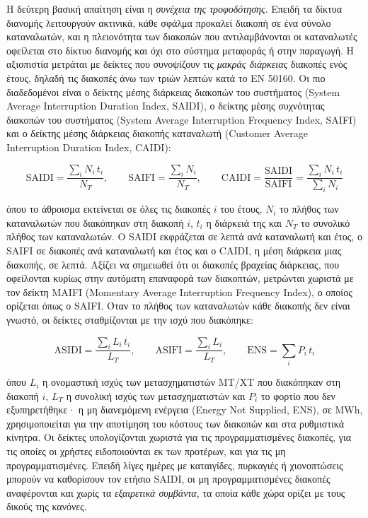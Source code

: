 Η δεύτερη βασική απαίτηση είναι η \emph{συνέχεια της τροφοδότησης}. Επειδή τα δίκτυα
διανομής λειτουργούν ακτινικά, κάθε σφάλμα προκαλεί διακοπή σε ένα σύνολο καταναλωτών, και
η πλειονότητα των διακοπών που αντιλαμβάνονται οι καταναλωτές οφείλεται στο δίκτυο διανομής
και όχι στο σύστημα μεταφοράς ή στην παραγωγή. Η αξιοπιστία μετράται με δείκτες που
συνοψίζουν τις \emph{μακράς διάρκειας} διακοπές ενός έτους, δηλαδή τις διακοπές άνω των
τριών λεπτών κατά το EN 50160. Οι πιο διαδεδομένοι είναι ο δείκτης μέσης διάρκειας διακοπών
του συστήματος (System Average Interruption Duration Index, SAIDI), ο δείκτης μέσης συχνότητας
διακοπών του συστήματος (System Average Interruption Frequency Index, SAIFI) και ο δείκτης
μέσης διάρκειας διακοπής καταναλωτή (Customer Average Interruption Duration Index, CAIDI):

\begin{equation}
\mathrm{SAIDI} = \frac{\sum_i N_i\,t_i}{N_T}, \qquad
\mathrm{SAIFI} = \frac{\sum_i N_i}{N_T}, \qquad
\mathrm{CAIDI} = \frac{\mathrm{SAIDI}}{\mathrm{SAIFI}} = \frac{\sum_i N_i\,t_i}{\sum_i N_i}
\label{eq:saidi}
\end{equation}

όπου το άθροισμα εκτείνεται σε όλες τις διακοπές $i$ του έτους, $N_i$ το πλήθος των
καταναλωτών που διακόπηκαν στη διακοπή $i$, $t_i$ η διάρκειά της και $N_T$ το συνολικό πλήθος
των καταναλωτών. Ο SAIDI εκφράζεται σε λεπτά ανά καταναλωτή και έτος, ο SAIFI σε διακοπές
ανά καταναλωτή και έτος και ο CAIDI, η μέση διάρκεια μιας διακοπής, σε λεπτά. Αξίζει να
σημειωθεί ότι οι διακοπές βραχείας διάρκειας, που οφείλονται κυρίως στην αυτόματη επαναφορά των
διακοπτών, μετρώνται χωριστά με τον δείκτη MAIFI (Momentary Average Interruption
Frequency Index), ο οποίος ορίζεται όπως ο SAIFI. Όταν το πλήθος των καταναλωτών κάθε διακοπής
δεν είναι γνωστό, οι δείκτες σταθμίζονται με την ισχύ που διακόπηκε:

\begin{equation}
\mathrm{ASIDI} = \frac{\sum_i L_i\,t_i}{L_T}, \qquad
\mathrm{ASIFI} = \frac{\sum_i L_i}{L_T}, \qquad
\mathrm{ENS} = \sum_i P_i\,t_i
\label{eq:asidi}
\end{equation}

όπου $L_i$ η ονομαστική ισχύς των μετασχηματιστών ΜΤ/ΧΤ που διακόπηκαν στη διακοπή $i$, $L_T$
η συνολική ισχύς των μετασχηματιστών και $P_i$ το φορτίο που δεν εξυπηρετήθηκε· η μη
διανεμόμενη ενέργεια (Energy Not Supplied, ENS), σε MWh, χρησιμοποιείται για την αποτίμηση
του κόστους των διακοπών και στα ρυθμιστικά κίνητρα. Οι δείκτες υπολογίζονται χωριστά για τις
προγραμματισμένες διακοπές, για τις οποίες οι χρήστες ειδοποιούνται εκ των προτέρων, και για
τις μη προγραμματισμένες. Επειδή λίγες ημέρες με καταιγίδες, πυρκαγιές ή χιονοπτώσεις
μπορούν να καθορίσουν τον ετήσιο SAIDI, οι μη προγραμματισμένες διακοπές αναφέρονται και
χωρίς τα \emph{εξαιρετικά συμβάντα}, τα οποία κάθε χώρα ορίζει με τους δικούς της κανόνες.

